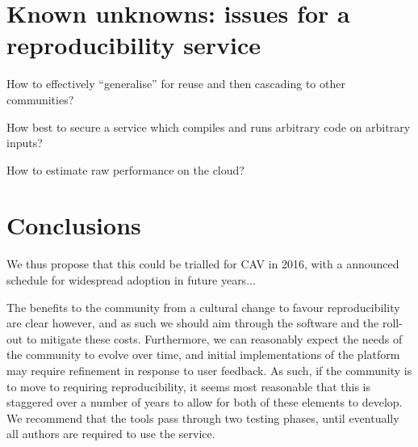 \documentclass{llncs}
\begin{document}


\section{Known unknowns: issues for a reproducibility service}\label{issues} 

How to effectively ``generalise'' for reuse and then cascading to other communities?

How best to secure a service which compiles and runs arbitrary code on arbitrary inputs?

How to estimate raw performance on the cloud?

\section{Conclusions}\label{concl}
We thus propose that this could be trialled for CAV in 2016, with a
announced schedule for widespread adoption in future years...

The benefits to the community from a cultural change to favour
reproducibility are clear however, and as such we should aim through
the software and the roll-out to mitigate these costs. Furthermore, we
can reasonably expect the needs of the community to evolve over time,
and initial implementations of the platform may require refinement in
response to user feedback. As such, if the community is to move to
requiring reproducibility, it seems most reasonable that this is
staggered over a number of years to allow for both of these elements
to develop. We recommend that the tools pass through two testing
phases, until eventually all authors are required to use the service.
\end{document}
